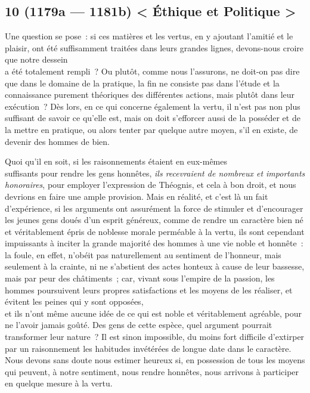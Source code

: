 \documentclass[french,twoside]{book} %
\begin{document}
\subsection[{10 (1179a — 1181b) < Éthique et Politique >}]{10 (1179a — 1181b) < Éthique et Politique >}
\noindent Une question se pose : si ces matières et les vertus, en y ajoutant l’amitié et le plaisir, ont été suffisamment traitées dans leurs grandes lignes, devons-nous croire que notre dessein \\
a été totalement rempli ? Ou plutôt, comme nous l’assurons, ne doit-on pas dire que dans le domaine de la pratique, la fin ne  consiste pas dans l’étude et la connaissance purement théoriques des différentes actions, mais plutôt dans leur exécution ? Dès lors, en ce qui concerne également la vertu, il n’est pas non plus suffisant de savoir ce qu’elle est, mais on doit s’efforcer aussi de la posséder et de la mettre en pratique, ou alors tenter par quelque autre moyen, s’il en existe, de devenir des hommes de bien.\par
Quoi qu’il en soit, si les raisonnements étaient en eux-mêmes \\
suffisants pour rendre les gens honnêtes, {\itshape ils recevraient de nombreux et importants honoraires}, pour employer l’expression de Théognis, et cela à bon droit, et nous devrions en faire une ample provision. Mais en réalité, et c’est là un fait d’expérience, si les arguments ont assurément la force de stimuler et d’encourager les jeunes gens doués d’un esprit généreux, comme de rendre un caractère bien né et véritablement épris de noblesse morale perméable à la vertu, ils sont cependant \\
impuissants à inciter la grande majorité des hommes à une vie noble et honnête : la foule, en effet, n’obéit pas naturellement au sentiment de l’honneur, mais seulement à la crainte, ni ne s’abstient des actes honteux à cause de leur bassesse, mais par peur des châtiments ; car, vivant sous l’empire de la passion, les hommes poursuivent leurs propres satisfactions et les moyens de les réaliser, et évitent les peines qui y sont opposées, \\
et ils n’ont même aucune idée de ce qui est noble et véritablement agréable, pour ne l’avoir jamais goûté. Des gens de cette espèce, quel argument pourrait transformer leur nature ? Il est sinon impossible, du moins fort difficile d’extirper par un raisonnement les habitudes invétérées de longue date dans le caractère. Nous devons sans doute nous estimer heureux si, en possession de tous les moyens qui peuvent, à notre sentiment, nous rendre honnêtes, nous arrivons à participer en quelque mesure à la vertu.\par
\end{document}
